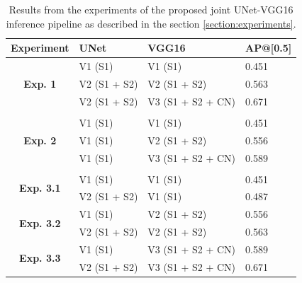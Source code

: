 \documentclass[10pt,twocolumn,letterpaper]{article}
\begin{document}
\begin{table}[]
\caption{Results from the experiments of the proposed joint UNet-VGG16 inference pipeline as described in the section \ref{section:experiments}.}
\label{tab:results}
\begin{tabular}{|c|l|l|l|}
\hline
\multicolumn{1}{|l|}{\textbf{Experiment}} & \textbf{UNet} & \textbf{VGG16}    & \textbf{AP@{[}0.5{]}} \\ \hline
\multirow{3}{*}{\textbf{Exp. 1}}          & V1 (S1)       & V1 (S1)           & 0.451                 \\ \cline{2-4} 
                                          & V2 (S1 + S2)  & V2 (S1 + S2)      & 0.563                 \\ \cline{2-4} 
                                          & V2 (S1 + S2)  & V3 (S1 + S2 + CN) & 0.671                 \\ \hline
\multicolumn{4}{|l|}{}                                                                                \\ \hline
\multirow{3}{*}{\textbf{Exp. 2}}          & V1 (S1)       & V1 (S1)           & 0.451                 \\ \cline{2-4} 
                                          & V1 (S1)       & V2 (S1 + S2)      & 0.556                 \\ \cline{2-4} 
                                          & V1 (S1)       & V3 (S1 + S2 + CN) & 0.589                 \\ \hline
\multicolumn{4}{|l|}{}                                                                                \\ \hline
\multirow{2}{*}{\textbf{Exp. 3.1}}        & V1 (S1)       & V1 (S1)           & 0.451                 \\ \cline{2-4} 
                                          & V2 (S1 + S2)  & V1 (S1)           & 0.487                 \\ \hline
\multirow{2}{*}{\textbf{Exp. 3.2}}        & V1 (S1)       & V2 (S1 + S2)      & 0.556                 \\ \cline{2-4} 
                                          & V2 (S1 + S2)  & V2 (S1 + S2)      & 0.563                 \\ \hline
\multirow{2}{*}{\textbf{Exp. 3.3}}        & V1 (S1)       & V3 (S1 + S2 + CN) & 0.589                 \\ \cline{2-4} 
                                          & V2 (S1 + S2)  & V3 (S1 + S2 + CN) & 0.671                 \\ \hline
\end{tabular}
\end{table}
\end{document}
